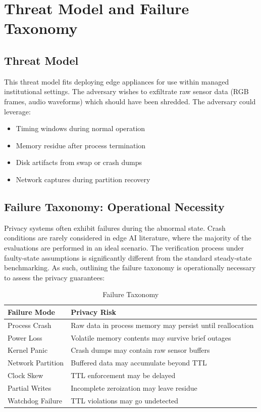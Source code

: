 \documentclass[conference]{IEEEtran}
\begin{document}
\section{Threat Model and Failure Taxonomy}

\subsection{Threat Model}
This threat model fits deploying edge appliances for use within managed institutional settings. The adversary wishes to exfiltrate raw sensor data (RGB frames, audio waveforms) which should have been shredded. The adversary could leverage:
\begin{itemize}
    \item Timing windows during normal operation
    \item Memory residue after process termination
    \item Disk artifacts from swap or crash dumps
    \item Network captures during partition recovery
\end{itemize}

\subsection{Failure Taxonomy: Operational Necessity}
Privacy systems often exhibit failures during the abnormal state. Crash conditions are rarely considered in edge AI literature, where the majority of the evaluations are performed in an ideal scenario. The verification process under faulty-state assumptions is significantly different from the standard steady-state benchmarking. As such, outlining the failure taxonomy is operationally necessary to assess the privacy guarantees:

\begin{table}[htbp]
\caption{Failure Taxonomy}
\centering
\begin{tabular}{@{}p{2.6cm} p{5.5cm}@{}}
\toprule
\textbf{Failure Mode} & \textbf{Privacy Risk} \\
\midrule
Process Crash & Raw data in process memory may persist until reallocation \\
Power Loss & Volatile memory contents may survive brief outages \\
Kernel Panic & Crash dumps may contain raw sensor buffers \\
Network Partition & Buffered data may accumulate beyond TTL \\
Clock Skew & TTL enforcement may be delayed \\
Partial Writes & Incomplete zeroization may leave residue \\
Watchdog Failure & TTL violations may go undetected \\
\bottomrule
\end{tabular}
\label{tab:failure}
\end{table}
\end{document}
